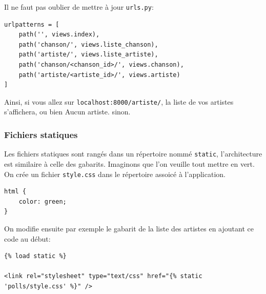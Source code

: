 \documentclass[a4paper, 10pt]{article}
\begin{document}
Il ne faut pas oublier de mettre à jour \texttt{urls.py}:
\begin{verbatim}
urlpatterns = [
    path('', views.index),
    path('chanson/', views.liste_chanson),
    path('artiste/', views.liste_artiste),
    path('chanson/<chanson_id>/', views.chanson),
    path('artiste/<artiste_id>/', views.artiste)
]
\end{verbatim}

Ainsi, si vous allez sur \texttt{localhost:8000/artiste/}, la liste de vos artistes s'affichera, ou bien \og Aucun artiste. \fg{} sinon.

\subsubsection{Fichiers statiques}

Les fichiers statiques sont rangés dans un répertoire nommé \texttt{static}, l'architecture est similaire à celle des gabarits. Imaginons que l'on veuille tout mettre en vert. On crée un fichier \texttt{style.css} dans le répertoire assoicé à l'application.

\begin{verbatim}
html {
    color: green;
}
\end{verbatim}

On modifie ensuite par exemple le gabarit de la liste des artistes en ajoutant ce code au début:
\begin{verbatim}
{% load static %}

<link rel="stylesheet" type="text/css" href="{% static 'polls/style.css' %}" />
\end{verbatim}
\end{document}
